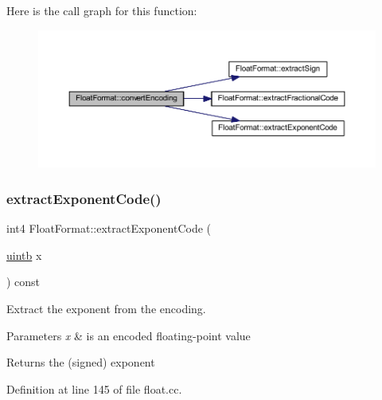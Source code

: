 Here is the call graph for this function\+:
\nopagebreak
\begin{figure}[H]
\begin{center}
\leavevmode
\includegraphics[width=350pt]{class_float_format_a8b9460ada306b44861228990529d5410_cgraph}
\end{center}
\end{figure}
\mbox{\label{class_float_format_a266d06329a88845bbc202b87141f64df}} 
\subsubsection{\texorpdfstring{extractExponentCode()}{extractExponentCode()}}
{\footnotesize\ttfamily int4 Float\+Format\+::extract\+Exponent\+Code (\begin{DoxyParamCaption}\item[{\mbox{\hyperlink{types_8h_a2db313c5d32a12b01d26ac9b3bca178f}{uintb}}}]{x }\end{DoxyParamCaption}) const}



Extract the exponent from the encoding. 


\begin{DoxyParams}{Parameters}
{\em x} & is an encoded floating-\/point value \\
\hline
\end{DoxyParams}
\begin{DoxyReturn}{Returns}
the (signed) exponent 
\end{DoxyReturn}


Definition at line 145 of file float.\+cc.

